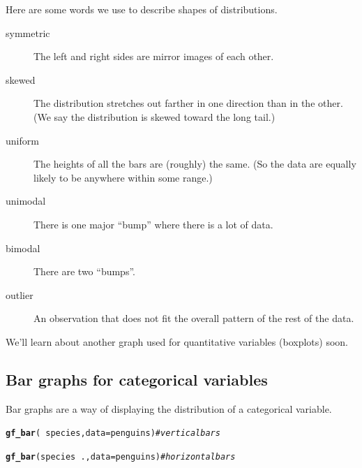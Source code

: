 \documentclass[twoside]{book}\usepackage[]{graphicx}\usepackage[]{xcolor}
\makeatletter
\newcommand{\hlcom}[1]{\textcolor[rgb]{0.678,0.584,0.686}{\textit{#1}}}%
\newcommand{\hlopt}[1]{\textcolor[rgb]{0,0,0}{#1}}%
\newcommand{\hlstd}[1]{\textcolor[rgb]{0.345,0.345,0.345}{#1}}%
\newcommand{\hlkwc}[1]{\textcolor[rgb]{0.333,0.667,0.333}{#1}}%
\newcommand{\hlkwd}[1]{\textcolor[rgb]{0.737,0.353,0.396}{\textbf{#1}}}%
\newenvironment{kframe}{%
 \def\at@end@of@kframe{}%
 \ifinner\ifhmode%
  \def\at@end@of@kframe{\end{minipage}}%
  \begin{minipage}{\columnwidth}%
 \fi\fi%
 \def\FrameCommand##1{\hskip\@totalleftmargin \hskip-\fboxsep
 \colorbox{shadecolor}{##1}\hskip-\fboxsep
     \hskip-\linewidth \hskip-\@totalleftmargin \hskip\columnwidth}%
 \MakeFramed {\advance\hsize-\width
   \@totalleftmargin\z@ \linewidth\hsize
   \@setminipage}}%
 {\par\unskip\endMakeFramed%
 \at@end@of@kframe}
\newenvironment{knitrout}{}{} %
\makeatother
\begin{document}
Here are some words we use to describe shapes of distributions.
\begin{description}
\item[symmetric] The left and right sides are mirror images of each other.
\item[skewed] The distribution stretches out farther in one direction than in the other.  
(We say the distribution is skewed toward the long tail.)
\item[uniform] The heights of all the bars are (roughly) the same.  
(So the data are equally likely to be anywhere within some range.)
\item[unimodal] There is one major ``bump'' where there is a lot of data.
\item[bimodal] There are two ``bumps''.
\item[outlier] An observation that does not fit the overall pattern of the rest of 
the data.
\end{description}

We'll learn about another graph used for quantitative variables (boxplots)
soon.

\subsection{Bar graphs for categorical variables}

Bar graphs are a way of displaying the distribution of a categorical variable.

\begin{knitrout}
\color{fgcolor}\begin{kframe}
\begin{alltt}
\hlkwd{gf_bar}\hlstd{(} \hlopt{~} \hlstd{species,} \hlkwc{data} \hlstd{= penguins)}   \hlcom{# vertical bars}
\end{alltt}


{\ttfamily\noindent\bfseries\color{errorcolor}{\#\# Error in gf\_ingredients(formula = gformula, data = data, gg\_object = object, : object 'penguins' not found}}\begin{alltt}
\hlkwd{gf_bar}\hlstd{(species} \hlopt{~} \hlstd{.,} \hlkwc{data} \hlstd{= penguins)}  \hlcom{# horizontal bars}
\end{alltt}


{\ttfamily\noindent\bfseries\color{errorcolor}{\#\# Error in gf\_ingredients(formula = gformula, data = data, gg\_object = object, : object 'penguins' not found}}\end{kframe}
\end{knitrout}
\end{document}
